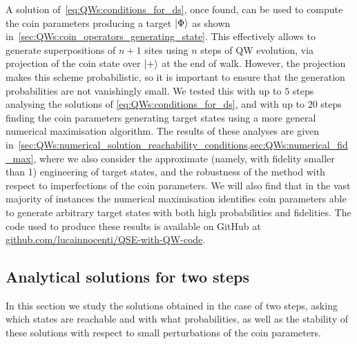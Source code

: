 A solution of~\cref{eq:QWs:conditions_for_ds}, once found, can be used to compute the coin parameters producing a target $\ket\Phi$ as shown in~\cref{sec:QWs:coin_operators_generating_state}.
This effectively allows to generate superpositions of $n+1$ sites using $n$ steps of \ac{QW} evolution, via projection of the coin state over $\ket+$ at the end of walk.
However, the projection makes this scheme probabilistic, so it is important to ensure that the generation probabilities are not vanishingly small.
We tested this with up to $5$ steps analysing the solutions of \cref{eq:QWs:conditions_for_ds}, and with up to $20$ steps finding the coin parameters generating target states using a more general numerical maximisation algorithm.
The results of these analyses are given in~\cref{sec:QWs:numerical_solution_reachability_conditions,sec:QWs:numerical_fid_max},
where we also consider the approximate (namely, with fidelity smaller than 1) engineering of target states,
and the robustness of the method with respect to imperfections of the coin parameters.
We will also find that in the vast majority of instances the numerical maximisation identifies coin parameters able to generate arbitrary target states with both high probabilities and fidelities.
The code used to produce these results is available on GitHub at \href{https://github.com/lucainnocenti/QSE-with-QW-code}{github.com/lucainnocenti/QSE-with-QW-code}.

\subsection{Analytical solutions for two steps}
\label{sec:QWs:analytical_sol_2steps}

In this section we study the solutions obtained in the case of two steps, asking which states are reachable and with what probabilities, as well as the stability of these solutions with respect to small perturbations of the coin parameters.

